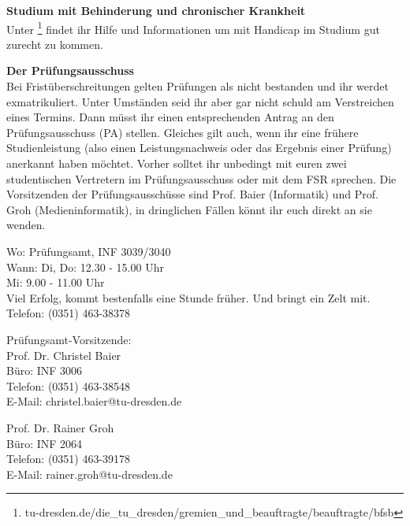 \textbf{Studium mit Behinderung und chronischer Krankheit} \\
Unter \footnote{tu-dresden.de/die\_tu\_dresden/gremien\_und\_beauftragte/beauftragte/bfsb} findet ihr Hilfe und Informationen um mit Handicap im Studium gut zurecht zu kommen.

\textbf{Der Prüfungsausschuss} \\
Bei Fristüberschreitungen gelten Prüfungen als nicht bestanden und ihr werdet exmatrikuliert.
Unter Umständen seid ihr aber gar nicht schuld am Verstreichen eines Termins.
Dann müsst ihr einen entsprechenden Antrag an den Prüfungsausschuss (PA) stellen.
Gleiches gilt auch, wenn ihr eine frühere Studienleistung (also einen Leistungsnachweis oder das Ergebnis einer Prüfung) anerkannt haben möchtet.
Vorher solltet ihr unbedingt mit euren zwei studentischen Vertretern im Prüfungsausschuss oder mit dem FSR sprechen.
Die Vorsitzenden der Prüfungsausschüsse sind Prof. Baier (Informatik) und Prof. Groh (Medieninformatik), in dringlichen Fällen könnt ihr euch direkt an sie wenden.

Wo: Prüfungsamt, INF 3039/3040 \\
Wann: Di, Do: 12.30 - 15.00 Uhr \\
Mi: 9.00 - 11.00 Uhr \\
Viel Erfolg, kommt bestenfalls eine Stunde früher.
Und bringt ein Zelt mit. \\
Telefon: (0351) 463-38378

Prüfungsamt-Vorsitzende: \\
Prof. Dr. Christel Baier \\
Büro: INF 3006 \\
Telefon: (0351) 463-38548 \\
E-Mail: christel.baier@tu-dresden.de

Prof. Dr. Rainer Groh \\
Büro: INF 2064 \\
Telefon: (0351) 463-39178 \\
E-Mail: rainer.groh@tu-dresden.de
